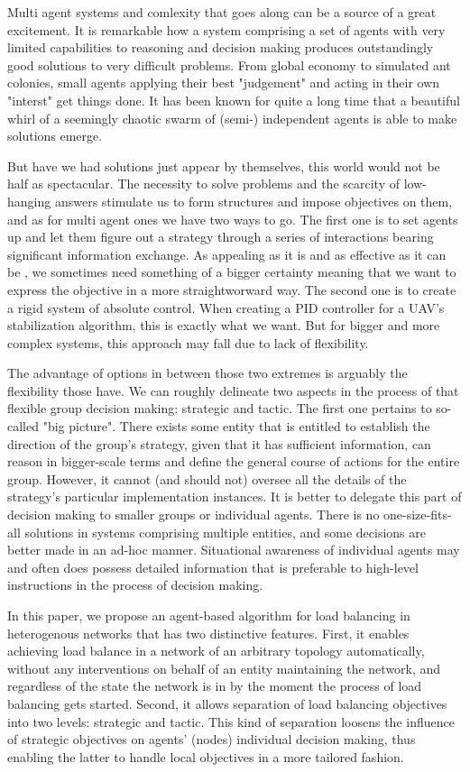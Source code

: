 Multi agent systems and comlexity that goes along can be a source of a great excitement.
It is remarkable how a system comprising a set of agents with very limited capabilities to reasoning and decision making produces outstandingly good solutions to very difficult problems.
From global economy to simulated ant colonies, small agents applying their best "judgement" and acting in their own "interst" get things done.
It has been known for quite a long time that a beautiful whirl of a seemingly chaotic swarm of (semi-) independent agents is able to make solutions emerge.

But have we had solutions just appear by themselves, this world would not be half as spectacular.
The necessity to solve problems and the scarcity of low-hanging answers stimulate us to form structures and impose objectives on them, and as for multi agent ones we have two ways to go.
The first one is to set agents up and let them figure out a strategy through a series of interactions bearing significant information exchange.
As appealing as it is and as effective as it can be \cite{dorigo-2006}, we sometimes need something of a bigger certainty meaning that we want to express the objective in a more straightworward way.
The second one is to create a rigid system of absolute control.
When creating a PID controller for a UAV's stabilization algorithm, this is exactly what we want.
But for bigger and more complex systems, this approach may fall due to lack of flexibility.

The advantage of options in between those two extremes is arguably the flexibility those have. We can roughly delineate two
aspects in the process of that flexible group decision making: strategic and tactic. The first one pertains to
so-called "big picture". There exists some entity that is entitled to establish the direction of the group's strategy, given that it
has sufficient information, can reason in bigger-scale terms and define the general course of actions for the entire
group. However, it cannot (and should not) oversee all the details of the strategy's particular implementation
instances. It is better to delegate this part of decision making to smaller groups or individual agents. There is no
one-size-fits-all solutions in systems comprising multiple entities, and some decisions are better made in an ad-hoc
manner.
Situational awareness \cite{endsley-1995} of individual agents may and often does possess detailed information that
is preferable to high-level instructions in the process of decision making.

In this paper, we propose an agent-based algorithm for load balancing in heterogenous networks that has two distinctive features.
First, it enables achieving load balance in a network of an arbitrary topology automatically, without any interventions on behalf of an entity maintaining the network, and regardless of the state the network is in by the moment the process of load balancing gets started.
Second, it allows separation of load balancing objectives into two levels: strategic and tactic.
This kind of separation loosens the influence of strategic objectives on  agents' (nodes) individual decision making, thus enabling the latter to handle local objectives in a more tailored fashion.


